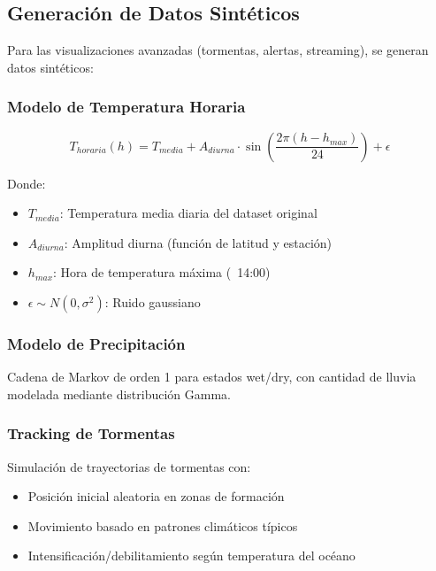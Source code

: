 \documentclass[12pt,a4paper]{scrartcl}
\begin{document}
\subsection{Generación de Datos Sintéticos}

Para las visualizaciones avanzadas (tormentas, alertas, streaming), se generan datos sintéticos:

\subsubsection{Modelo de Temperatura Horaria}

\begin{equation}
    T_{horaria}(h) = T_{media} + A_{diurna} \cdot \sin\left(\frac{2\pi(h - h_{max})}{24}\right) + \epsilon
\end{equation}

Donde:
\begin{itemize}
    \item $T_{media}$: Temperatura media diaria del dataset original
    \item $A_{diurna}$: Amplitud diurna (función de latitud y estación)
    \item $h_{max}$: Hora de temperatura máxima (~14:00)
    \item $\epsilon \sim N(0, \sigma^2)$: Ruido gaussiano
\end{itemize}

\subsubsection{Modelo de Precipitación}

Cadena de Markov de orden 1 para estados wet/dry, con cantidad de lluvia modelada mediante distribución Gamma.

\subsubsection{Tracking de Tormentas}

Simulación de trayectorias de tormentas con:
\begin{itemize}
    \item Posición inicial aleatoria en zonas de formación
    \item Movimiento basado en patrones climáticos típicos
    \item Intensificación/debilitamiento según temperatura del océano
\end{itemize}
\end{document}
